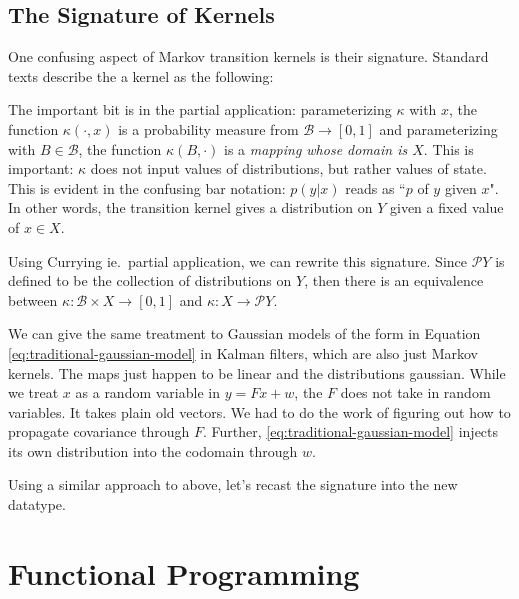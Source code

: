 \section{The Signature of Kernels}
\label{sec:kernel-signature}

One confusing aspect of Markov transition kernels is their signature. 
Standard texts describe the a kernel as the following:


The important bit is in the partial application: parameterizing $\kappa$ with $x$, the function $\kappa(\cdot, x)$ is a probability measure from $\mathcal{B} \rightarrow [0,1]$ and parameterizing with $B\in \mathcal{B}$, the function $\kappa(B,\cdot)$ is a \emph{mapping whose domain is $X$}.
This is important: $\kappa$ does not input values of distributions, but rather values of state.
This is evident in the confusing bar notation: $p(y|x)$ reads as ``$p$ of $y$ given $x$".
In other words, the transition kernel gives a distribution on $Y$ given a fixed value of $x\in X$.

\newcommand{\giry}{\mathcal{P}}
Using Currying ie.\ partial application, we can rewrite this signature. 
Since $\giry Y$ is defined to be the collection of distributions on $Y$, then there is an equivalence between $\kappa : \mathcal{B} \times X \rightarrow [0,1]$ and $\kappa : X \rightarrow \giry Y$.

We can give the same treatment to Gaussian models of the form in Equation \ref{eq:traditional-gaussian-model} in Kalman filters, which are also just Markov kernels. The maps just happen to be linear and the distributions gaussian.
While we treat $x$ as a random variable in $y = Fx + w$, the $F$ does not take in random variables.
It takes plain old vectors.
We had to do the work of figuring out how to propagate covariance through $F$.
Further, \ref{eq:traditional-gaussian-model} injects its own distribution into the codomain through $w$.


Using a similar approach to above, let's recast the signature into the new datatype.


\chapter{Functional Programming}
